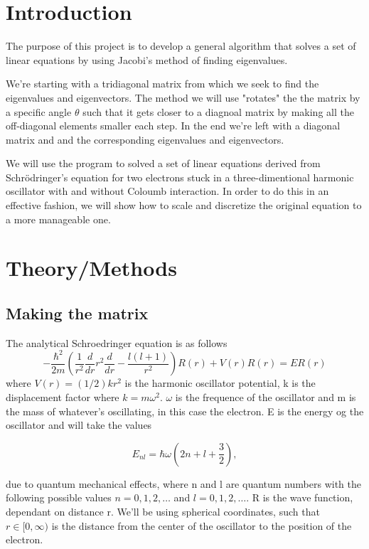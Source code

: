 \documentclass[10pt]{article}
\begin{document}
\begin{multicols}{2}


\section{Introduction}
    The purpose of this project is to develop a general algorithm that
    solves a set of linear equations by using Jacobi's method of finding
    eigenvalues. 

We're starting with a tridiagonal matrix from which we seek to find the
eigenvalues and eigenvectors. The method we will use "rotates" the the
matrix by a specific angle $\theta$ such that it gets closer to a diagnoal
matrix by making all the off-diagonal elements smaller each step. In the
end we're left with a diagonal matrix and and the corresponding eigenvalues
and eigenvectors.

We will use the program to solved a set of linear equations derived from
Schrödringer's equation for two electrons stuck in a three-dimentional
harmonic oscillator with and without Coloumb interaction. In order to do
this in an effective fashion, we will show how to scale and discretize the
original equation to a more manageable one.



\section{Theory/Methods}
\subsection{Making the matrix}
The analytical Schroedringer equation is as follows
\begin{equation*}
  -\frac{\hbar^2}{2 m} \left ( \frac{1}{r^2} \frac{d}{dr} r^2
  \frac{d}{dr} - \frac{l (l + 1)}{r^2} \right )R(r) 
     + V(r) R(r) = E R(r)
\end{equation*}
where  $V(r) = (1/2)kr^2$ is the harmonic oscillator potential, k is the
displacement factor where $k=m\omega^2$.  $\omega$ is the frequence of the
oscillator and m is the mass of whatever's oscillating, in this case the
electron. E is the energy og the oscillator and will take the values

\begin{equation*}
E_{nl}=  \hbar \omega \left(2n+l+\frac{3}{2}\right),
\end{equation*}

due to quantum mechanical effects, where n and l are quantum numbers with
the following possible values $n=0,1,2,\dots$ and $l=0,1,2,\dots$. R is the
wave function, dependant on distance r. We'll be using spherical
coordinates, such that $r\in [0,\infty)$ is the distance from the center of
the oscillator to the position of the electron.\\


\end{multicols}
\end{document}
